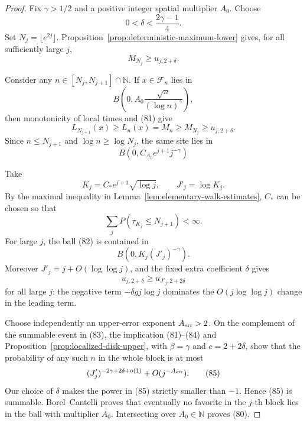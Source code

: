\begin{proof}
Fix \(\gamma>1/2\) and a positive integer spatial multiplier \(A_0\).
Choose
\[
       0<\delta<\frac{2\gamma-1}{4}.
\]
Set \(N_j=\lfloor e^{2j}\rfloor\).
Proposition~\ref{prop:deterministic-maximum-lower} gives, for all
sufficiently large \(j\),
\begin{equation}
M_{N_j}\ge u_{j,2+\delta}.                             \tag{81}
\end{equation}

Consider any \(n\in[N_j,N_{j+1}]\cap\mathbb N\).  If
\(x\in\mathcal F_n\) lies in
\[
       B\left(0,A_0\frac{\sqrt n}{(\log n)^\gamma}\right),
\]
then monotonicity of local times and (81) give
\[
 L_{N_{j+1}}(x)\ge L_n(x)=M_n\ge M_{N_j}
       \ge u_{j,2+\delta}.
\]
Since \(n\le N_{j+1}\) and \(\log n\ge\log N_j\), the same site lies in
\begin{equation}
B\left(0,C_{A_0}e^{j+1}j^{-\gamma}\right)             \tag{82}
\end{equation}

Take
\[
       K_j=C_*e^{j+1}\sqrt{\log j},\qquad J'_j=\log K_j.
\]
By the maximal inequality in Lemma~\ref{lem:elementary-walk-estimates}, \(C_*\)
can be chosen so that
\begin{equation}
\sum_jP(\tau_{K_j}\le N_{j+1})<\infty.                 \tag{83}
\end{equation}
For large \(j\), the ball (82) is contained in
\[
       B(0,K_j(J'_j)^{-\gamma}).
\]
Moreover \(J'_j=j+O(\log\log j)\), and the fixed extra coefficient
\(\delta\) gives
\begin{equation}
u_{j,2+\delta}\ge u_{J'_j,2+2\delta}                  \tag{84}
\end{equation}
for all large \(j\): the negative term
\(-\delta g j\log j\) dominates the \(O(j\log\log j)\) change in the
leading term.

Choose independently an upper-error exponent \(A_{\rm err}>2\).
On the complement of the summable event in (83), the implication
(81)--(84) and Proposition~\ref{prop:localized-disk-upper}, with
\(\beta=\gamma\) and \(c=2+2\delta\), show that the probability of any
such \(n\) in the whole block is at most
\begin{equation}
(J'_j)^{-2\gamma+2\delta+o(1)}+O(j^{-A_{\rm err}}).     \tag{85}
\end{equation}
Our choice of \(\delta\) makes the power in (85) strictly smaller than
\(-1\).  Hence (85) is summable.  Borel--Cantelli proves that eventually
no favorite in the \(j\)-th block lies in the ball with multiplier \(A_0\).
Intersecting over \(A_0\in\mathbb N\) proves (80).
\end{proof}


